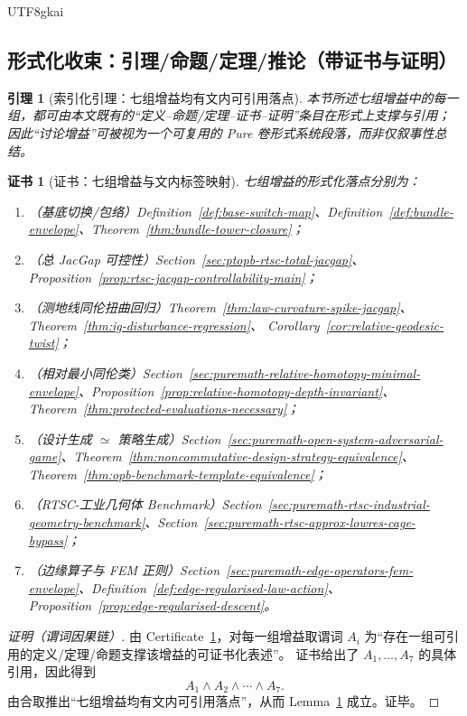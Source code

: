 \documentclass[12pt]{article}
\newtheorem{lemma}{引理}[section]
\newtheorem{certificate}{证书}[section]
\newcommand{\RTSC}{\textsf{RTSC}}
\begin{document}
\begin{CJK*}{UTF8}{gkai}
\subsection{形式化收束：引理/命题/定理/推论（带证书与证明）}

\begin{lemma}[索引化引理：七组增益均有文内可引用落点]
\label{lem:discussion-gains-indexed}
本节所述七组增益中的每一组，都可由本文既有的“定义--命题/定理--证书--证明”条目在形式上支撑与引用；
因此“讨论增益”可被视为一个可复用的 Pure 卷形式系统段落，而非仅叙事性总结。
\end{lemma}

\begin{certificate}[证书：七组增益与文内标签映射]
\label{cert:discussion-gains-map}
七组增益的形式化落点分别为：
\begin{enumerate}
  \item（基底切换/包络）Definition~\ref{def:base-switch-map}、Definition~\ref{def:bundle-envelope}、Theorem~\ref{thm:bundle-tower-closure}；
  \item（总 JacGap 可控性）Section~\ref{sec:ptopb-rtsc-total-jacgap}、Proposition~\ref{prop:rtsc-jacgap-controllability-main}；
  \item（测地线同伦扭曲回归）Theorem~\ref{thm:law-curvature-spike-jacgap}、Theorem~\ref{thm:ig-disturbance-regression}、
    Corollary~\ref{cor:relative-geodesic-twist}；
  \item（相对最小同伦类）Section~\ref{sec:puremath-relative-homotopy-minimal-envelope}、Proposition~\ref{prop:relative-homotopy-depth-invariant}、Theorem~\ref{thm:protected-evaluations-necessary}；
  \item（设计生成 $\simeq$ 策略生成）Section~\ref{sec:puremath-open-system-adversarial-game}、Theorem~\ref{thm:noncommutative-design-strategy-equivalence}、Theorem~\ref{thm:opb-benchmark-template-equivalence}；
  \item（\RTSC{}-工业几何体 Benchmark）Section~\ref{sec:puremath-rtsc-industrial-geometry-benchmark}、Section~\ref{sec:puremath-rtsc-approx-lowres-cage-bypass}；
  \item（边缘算子与 FEM 正则）Section~\ref{sec:puremath-edge-operators-fem-envelope}、Definition~\ref{def:edge-regularised-law-action}、Proposition~\ref{prop:edge-regularised-descent}。
\end{enumerate}
\end{certificate}

\begin{proof}[证明（谓词因果链）]
由 Certificate~\ref{cert:discussion-gains-map}，对每一组增益取谓词 $A_i$ 为“存在一组可引用的定义/定理/命题支撑该增益的可证书化表述”。
证书给出了 $A_1,\dots,A_7$ 的具体引用，因此得到
\[
A_1\wedge A_2\wedge \cdots \wedge A_7.
\]
由合取推出“七组增益均有文内可引用落点”，从而 Lemma~\ref{lem:discussion-gains-indexed} 成立。证毕。
\end{proof}


\end{CJK*}
\end{document}

